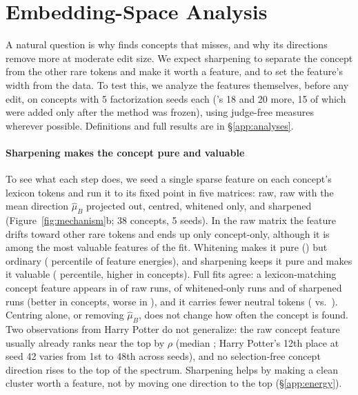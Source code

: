 \section{Embedding-Space Analysis}
\label{sec:analysis}

A natural question is why \cinder{} finds concepts that \ember{} misses, and why its directions remove more at moderate edit size.
We expect sharpening to separate the concept from the other rare tokens and make it worth a feature, and \gs{} to set the feature's width from the data.
To test this, we analyze the features themselves, before any edit, on  concepts with 5 factorization seeds each (\ember{}'s 18 and 20 more, 15 of which were added only after the method was frozen), using judge-free measures wherever possible.
Definitions and full results are in \S\ref{app:analyses}.

\paragraph{Sharpening makes the concept pure and valuable}
To see what each step does, we seed a single sparse feature on each concept's lexicon tokens and run it to its fixed point in five matrices: raw, raw with the mean direction $\hat\mu_B$ projected out, centred, whitened only, and sharpened (Figure~\ref{fig:mechanism}b; 38 concepts, 5 seeds).
In the raw matrix the feature drifts toward other rare tokens and ends up only  concept-only, although it is among the most valuable features of the fit.
Whitening makes it pure () but ordinary ( percentile of feature energies), and sharpening keeps it pure and makes it valuable ( percentile, higher in  concepts).
Full fits agree: a lexicon-matching concept feature appears in  of raw runs,  of whitened-only runs and  of sharpened runs (better in  concepts, worse in ), and it carries fewer neutral tokens ( vs.\ ).
Centring alone, or removing $\hat\mu_B$, does not change how often the concept is found.
Two observations from Harry Potter do not generalize: the raw concept feature usually already ranks near the top by $\rho$ (median ; Harry Potter's 12th place at seed 42 varies from 1st to 48th across seeds), and no selection-free concept direction rises to the top of the spectrum.
Sharpening helps by making a clean cluster worth a feature, not by moving one direction to the top (\S\ref{app:energy}).


